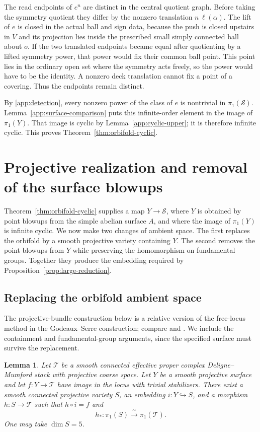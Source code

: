\documentclass[11pt,reqno]{amsart}
\numberwithin{equation}{section}
\newtheorem{lemma}[theorem]{Lemma}
\theoremstyle{definition}
\theoremstyle{remark}
\newcommand{\cS}{\mathcal S}
\begin{document}
The read endpoints of $e^n$ are distinct in the central quotient
graph.  Before taking the symmetry quotient they differ by the
nonzero translation $n\,\ell(\alpha)$.  The lift of $e$ is closed in
the actual ball and sign data, because the push is closed upstairs in $V$ and its projection lies
inside the prescribed small simply connected ball about $o$.  If the two translated endpoints became
equal after quotienting by a lifted symmetry power, that power would
fix their common ball point.  This point lies in the ordinary open
set where the symmetry acts freely, so the power would have to be
the identity.  A nonzero deck translation cannot fix a point of a
covering.  Thus the endpoints remain distinct.

By \eqref{app:detection}, every nonzero power of the class of $e$ is
nontrivial in $\pi_1(\cS)$.  Lemma~\ref{app:surface-comparison} puts
this infinite-order element in the image of $\pi_1(Y)$.  That image
is cyclic by Lemma~\ref{app:cyclic-upper}; it is therefore infinite
cyclic.  This proves Theorem~\ref{thm:orbifold-cyclic}.

\section{Projective realization and removal of the surface blowups}
\label{sec:projective}

Theorem~\ref{thm:orbifold-cyclic} supplies a map $Y\to\cS$, where $Y$
is obtained by point blowups from the simple abelian surface $A$, and
where the image of $\pi_1(Y)$ is infinite cyclic.  We now make two changes
of ambient space.  The first replaces the orbifold by a smooth projective
variety containing $Y$.  The second removes the point blowups from $Y$
while preserving the homomorphism on fundamental groups.  Together they
produce the embedding required by Proposition~\ref{prop:large-reduction}.

\subsection{Replacing the orbifold ambient space}

The projective-bundle construction below is a relative version of the
free-locus method in the Godeaux--Serre construction; compare
\cite[\S20]{Serre1958} and \cite[Remark~1.4 and \S5]{Totaro1999}.
We include the containment and fundamental-group arguments, since the
specified surface must survive the replacement.

\begin{lemma}\label{lem:ambient-realization}
Let $\mathcal T$ be a smooth connected effective proper complex
Deligne--Mumford stack with projective coarse space.  Let $Y$ be a smooth
projective surface and let $f:Y\to\mathcal T$ have image in the locus
with trivial stabilizers.  There exist a smooth connected projective
variety $S$, an embedding $i:Y\hookrightarrow S$, and a morphism
$h:S\to\mathcal T$ such that $h\circ i=f$ and
\[
 h_*:\pi_1(S)\xrightarrow{\ \sim\ }\pi_1(\mathcal T).
\]
One may take $\dim S=5$.
\end{lemma}
\end{document}
